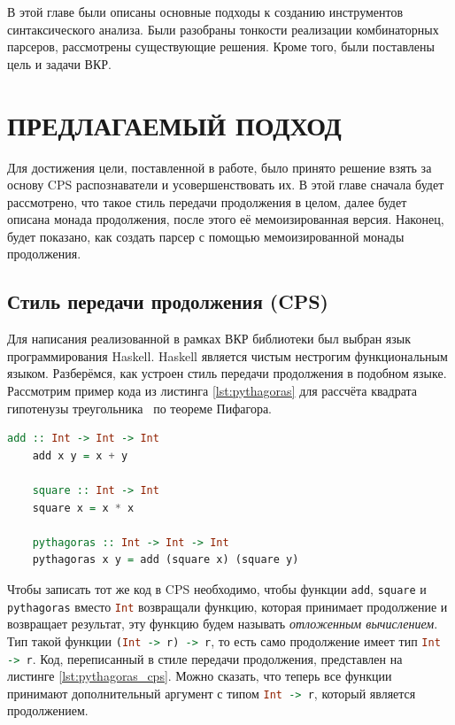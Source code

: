 \documentclass[times]{itmo-student-thesis}
\begin{document}
\chapterconclusion

В этой главе были описаны основные подходы к созданию инструментов синтаксического анализа. Были разобраны тонкости
реализации комбинаторных парсеров, рассмотрены существующие решения. Кроме того, были поставлены цель и задачи ВКР.

\chapter{ПРЕДЛАГАЕМЫЙ ПОДХОД}

Для достижения цели, поставленной в работе, было принято решение взять за основу CPS распознаватели и усовершенствовать их.
В этой главе сначала будет рассмотрено, что такое стиль передачи продолжения в целом, далее будет описана монада продолжения,
после этого её мемоизированная версия. Наконец, будет показано, как создать парсер с помощью мемоизированной монады продолжения.

\section{Стиль передачи продолжения (CPS)}\label{sec:cps}

Для написания реализованной в рамках ВКР библиотеки был выбран язык программирования Haskell. Haskell является чистым нестрогим функциональным языком. 
Разберёмся, как устроен стиль передачи продолжения в подобном языке. Рассмотрим пример кода из листинга 
\ref{lst:pythagoras} для рассчёта квадрата гипотенузы треугольника~\cite{noauthor_haskellcontinuation_nodate} по теореме Пифагора.

\begin{lstlisting}[language=Haskell,float=!h,caption={Теорема Пифагора},label={lst:pythagoras}]
    add :: Int -> Int -> Int
    add x y = x + y

    square :: Int -> Int
    square x = x * x

    pythagoras :: Int -> Int -> Int
    pythagoras x y = add (square x) (square y)
\end{lstlisting}

Чтобы записать тот же код в CPS необходимо, чтобы функции \lstinline[language=Haskell]{add},
\lstinline[language=Haskell]{square} и \lstinline[language=Haskell]{pythagoras} вместо \lstinline[language=Haskell]{Int}
возвращали функцию, которая принимает продолжение и возвращает результат, эту функцию будем называть \textit{отложенным вычислением}. Тип такой функции \lstinline[language=Haskell]{(Int -> r) -> r}, 
то есть само продолжение имеет тип \lstinline[language=Haskell]{Int -> r}. Код, переписанный в стиле передачи продолжения, 
представлен на листинге \ref{lst:pythagoras_cps}. Можно сказать, что теперь все функции принимают дополнительный аргумент 
с типом \lstinline[language=Haskell]{Int -> r}, который является продолжением.
\end{document}
